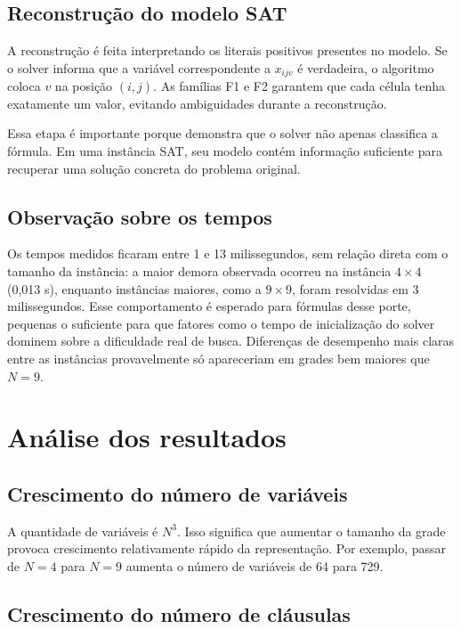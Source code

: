 \documentclass[a4paper, 12pt]{article}
\begin{document}
\subsection{Reconstrução do modelo SAT}

A reconstrução é feita interpretando os literais positivos presentes no modelo. Se o solver informa que a variável correspondente a \(x_{ijv}\) é verdadeira, o algoritmo coloca \(v\) na posição \((i,j)\). As famílias F1 e F2 garantem que cada célula tenha exatamente um valor, evitando ambiguidades durante a reconstrução.

Essa etapa é importante porque demonstra que o solver não apenas classifica a fórmula. Em uma instância SAT, seu modelo contém informação suficiente para recuperar uma solução concreta do problema original.

\subsection{Observação sobre os tempos}

Os tempos medidos ficaram entre 1 e 13 milissegundos, sem relação direta com o tamanho da instância: a maior demora observada ocorreu na instância \(4\times4\) (0,013 s), enquanto instâncias maiores, como a \(9\times9\), foram resolvidas em 3 milissegundos. Esse comportamento é esperado para fórmulas desse porte, pequenas o suficiente para que fatores como o tempo de inicialização do solver dominem sobre a dificuldade real de busca. Diferenças de desempenho mais claras entre as instâncias provavelmente só apareceriam em grades bem maiores que \(N=9\).

\section{Análise dos resultados}

\subsection{Crescimento do número de variáveis}

A quantidade de variáveis é \(N^3\). Isso significa que aumentar o tamanho da grade provoca crescimento relativamente rápido da representação. Por exemplo, passar de \(N=4\) para \(N=9\) aumenta o número de variáveis de 64 para 729.

\subsection{Crescimento do número de cláusulas}
\end{document}
